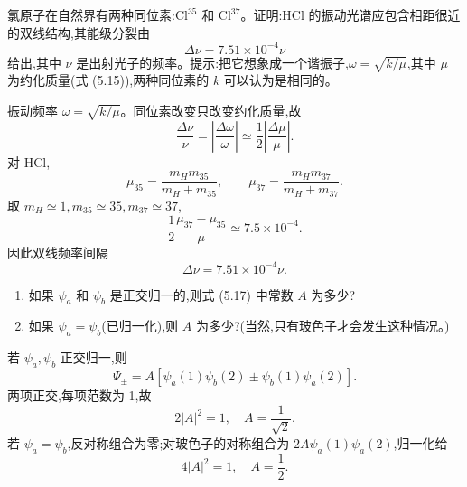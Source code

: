 \begin{question}
氯原子在自然界有两种同位素:$\mathrm{Cl}^{35}$ 和 $\mathrm{Cl}^{37}$。证明:$\mathrm{HCl}$ 的振动光谱应包含相距很近的双线结构,其能级分裂由
\[
\Delta \nu=7.51\times 10^{-4}\nu
\]
给出,其中 $\nu$ 是出射光子的频率。提示:把它想象成一个谐振子,$\omega=\sqrt{k/\mu}$,其中 $\mu$ 为约化质量(式 (5.15)),两种同位素的 $k$ 可以认为是相同的。

\par\smallskip
{}

\end{question}
\begin{solution}

振动频率 $\omega=\sqrt{k/\mu}$。同位素改变只改变约化质量,故
\[
\frac{\Delta\nu}{\nu}=\left|\frac{\Delta\omega}{\omega}\right|
\simeq \frac12\left|\frac{\Delta\mu}{\mu}\right|.
\]
对 HCl,
\[
\mu_{35}=\frac{m_Hm_{35}}{m_H+m_{35}},
\qquad
\mu_{37}=\frac{m_Hm_{37}}{m_H+m_{37}}.
\]
取 $m_H\simeq1,m_{35}\simeq35,m_{37}\simeq37$,
\[
\frac12\frac{\mu_{37}-\mu_{35}}{\mu}\simeq7.5\times10^{-4}.
\]
因此双线频率间隔
\[
\Delta\nu=7.51\times10^{-4}\nu.
\]

\end{solution}

\begin{question}
\begin{enumerate}
\item 如果 $\psi_a$ 和 $\psi_b$ 是正交归一的,则式 (5.17) 中常数 $A$ 为多少?
\item 如果 $\psi_a=\psi_b$(已归一化),则 $A$ 为多少?(当然,只有玻色子才会发生这种情况。)
\end{enumerate}

\par\smallskip
{}

\end{question}
\begin{solution}

若 $\psi_a,\psi_b$ 正交归一,则
\[
\Psi_\pm=A[\psi_a(1)\psi_b(2)\pm\psi_b(1)\psi_a(2)].
\]
两项正交,每项范数为 1,故
\[
2|A|^2=1,
\quad A=\frac1{\sqrt2}.
\]
若 $\psi_a=\psi_b$,反对称组合为零;对玻色子的对称组合为 $2A\psi_a(1)\psi_a(2)$,归一化给
\[
4|A|^2=1,
\quad A=\frac12.
\]

\end{solution}

